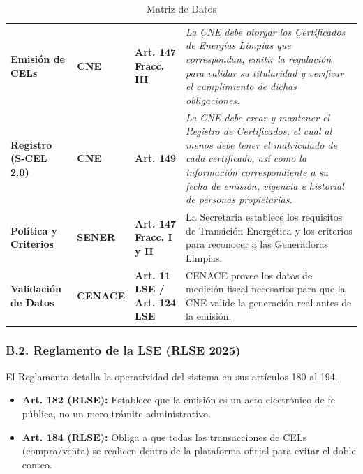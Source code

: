\documentclass{cel}
\begin{document}
\vspace{0.3cm}
\begin{tabladoradoLargo}
\renewcommand{\tabularxcolumn}[1]{p{#1}}
\begin{xltabular}{\textwidth}{|X|X|X|X|}
\caption{Matriz de Datos} \\
\toprule
{}  &  &  &  \\
\midrule
\endhead
\textbf{Emisión de CELs} & \textbf{CNE} & \textbf{Art. 147 Fracc. III} & \textit{\textquotedbl{}La CNE debe otorgar los Certificados de Energías Limpias que correspondan, emitir la regulación para validar su titularidad y verificar el cumplimiento de dichas obligaciones.\textquotedbl{}} \\ \hline
\textbf{Registro (S-CEL 2.0)} & \textbf{CNE} & \textbf{Art. 149} & \textit{\textquotedbl{}La CNE debe crear y mantener el Registro de Certificados, el cual al menos debe tener el matriculado de cada certificado, así como la información correspondiente a su fecha de emisión, vigencia e historial de personas propietarias.\textquotedbl{}} \\ \hline
\textbf{Política y Criterios} & \textbf{SENER} & \textbf{Art. 147 Fracc. I y II} & La Secretaría establece los requisitos de Transición Energética y los criterios para reconocer a las Generadoras Limpias. \\ \hline
\textbf{Validación de Datos} & \textbf{CENACE} & \textbf{Art. 11 LSE / Art. 124 LSE} & CENACE provee los datos de medición fiscal necesarios para que la CNE valide la generación real antes de la emisión. \\ \hline
\bottomrule
\end{xltabular}
\end{tabladoradoLargo}

\subsubsection{B.2. Reglamento de la LSE (RLSE 2025)}
\nopagebreak

El Reglamento detalla la operatividad del sistema en sus artículos 180 al 194.


\begin{itemize}
\item \textbf{Art. 182 (RLSE):} Establece que la emisión es un acto electrónico de fe pública, no un mero trámite administrativo.
\item \textbf{Art. 184 (RLSE):} Obliga a que todas las transacciones de CELs (compra/venta) se realicen dentro de la plataforma oficial para evitar el doble conteo.

\end{itemize}
\end{document}
